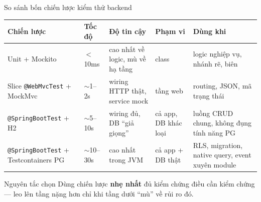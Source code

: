 \documentclass[aspectratio=169,12pt]{beamer}
\begin{document}
\begin{frame}{So sánh bốn chiến lược kiểm thử backend}
  \begin{center}
  \scriptsize
  \setlength{\tabcolsep}{3.5pt}
  \begin{tabular}{>{\raggedright\arraybackslash}p{2.7cm}>{\raggedright\arraybackslash}p{1.6cm}>{\raggedright\arraybackslash}p{2.4cm}>{\raggedright\arraybackslash}p{2.6cm}>{\raggedright\arraybackslash}p{3.2cm}}
    \toprule
    \textbf{Chiến lược} & \textbf{Tốc độ} & \textbf{Độ tin cậy} & \textbf{Phạm vi} & \textbf{Dùng khi} \\
    \midrule
    Unit + Mockito &
    $<$10ms & cao nhất về logic, mù về hạ tầng & 1 class &
    logic nghiệp vụ, nhánh rẽ, biên \\
    Slice \texttt{@WebMvcTest} + MockMvc &
    $\sim$1--2s & wiring HTTP thật, service mock & tầng web &
    routing, JSON, mã trạng thái \\
    \texttt{@SpringBootTest} + H2 &
    $\sim$5--10s & wiring đủ, DB ``giả giọng'' & cả app, DB khác loại &
    luồng CRUD chung, không đụng tính năng PG \\
    \texttt{@SpringBootTest} + Testcontainers PG &
    $\sim$10--30s & cao nhất trong JVM & cả app + DB thật &
    RLS, migration, native query, event xuyên module \\
    \bottomrule
  \end{tabular}
  \end{center}
  \vspace{0.3em}
  \begin{alertblock}{Nguyên tắc chọn}
    Dùng chiến lược \textbf{nhẹ nhất} đủ kiểm chứng điều cần kiểm chứng ---
    leo lên tầng nặng hơn chỉ khi tầng dưới ``mù'' về rủi ro đó.
  \end{alertblock}
\end{frame}
\end{document}

